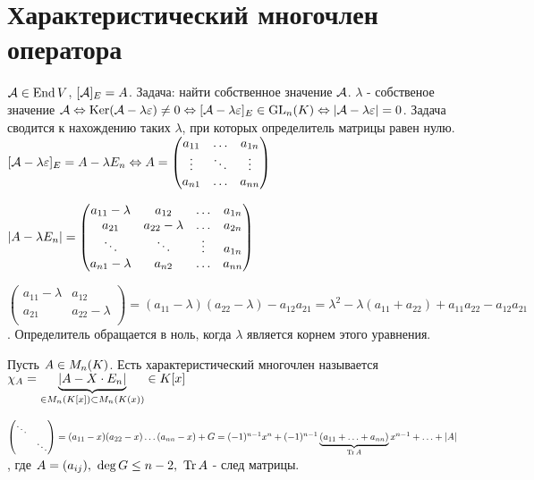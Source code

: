 \documentclass[main]{subfiles}
\begin{document}
\chapter{Характеристический многочлен оператора}

$\mathcal{A} \in \operatorname{End} V$, $[\mathcal{A}]_E = A$.
Задача: найти собственное значение $\mathcal{A}$.
$\lambda$ - собственое значение $\mathcal{A} \Leftrightarrow
    \operatorname{Ker}(\mathcal{A} - \lambda\varepsilon) \neq 0 \Leftrightarrow
    [\mathcal{A} - \lambda\varepsilon]_E \in \operatorname{GL}_n(K) \Leftrightarrow |\mathcal{A} - \lambda\varepsilon| = 0$. Задача сводится к нахождению таких
$\lambda$, при которых определитель матрицы равен нулю.
$[\mathcal{A} - \lambda\varepsilon]_E = A - \lambda E_n \Leftrightarrow
    A = \begin{pmatrix}
        a_{11} & \ldots & a_{1n} \\
        \vdots & \ddots & \vdots \\
        a_{n1} & \ldots & a_{nn} \\
    \end{pmatrix}$

$|A - \lambda E_n| = \begin{pmatrix}
        a_{11} - \lambda & a_{12}           & \ldots & a_{1n} \\
        a_{21}           & a_{22} - \lambda & \ldots & a_{2n} \\
        \ddots           & \ddots           & \vdots & a_{1n} \\
        a_{n1} - \lambda & a_{n2}           & \ldots & a_{nn} \\
    \end{pmatrix}$

$\begin{pmatrix}
        a_{11} - \lambda & a_{12}           \\
        a_{21}           & a_{22} - \lambda \\
    \end{pmatrix} = (a_{11} - \lambda)(a_{22} - \lambda) - a_{12} a_{21} =
    \lambda ^2 - \lambda(a_{11}+a_{22}) + a_{11}a_{22} - a_{12} a_{21}$. Определитель обращается в ноль, когда $\lambda$
является корнем этого уравнения.

\begin{definition}
    Пусть $A \in M_n(K)$. Есть характеристический многочлен называется
    $\chi_A = \underbrace{|A - X\cdot E_n|}_{\in M_n(K[x])\subset M_n(K(x))} \in K[x]$

    $\begin{pmatrix}
            \ddots &        \\
                   & \ddots \\
        \end{pmatrix} = (a_{11} - x)(a_{22} - x)\ldots(a_{nn} - x) + G =
        (-1)^{n-1}x^n+(-1)^{n-1}\underbrace{(a_{11}+\ldots+a_{nn})}_{\operatorname{Tr}A}x^{n-1}+\ldots+|A|$,
    где $\A= (a_{ij}),\ \deg G \leq n-2,\ \Tr\A$ - след матрицы.
\end{definition}
\end{document}
